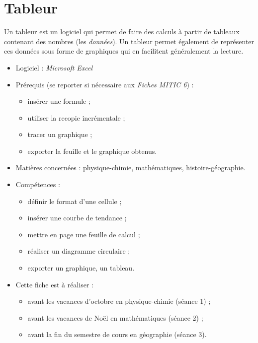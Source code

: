 \chapter{Tableur}  

Un tableur est un logiciel qui permet de faire des calculs à partir de tableaux contenant des nombres (les \emph{données}). Un tableur permet également de représenter ces données sous forme de graphiques qui en facilitent généralement la lecture.

{\footnotesize
\begin{itemize}
\item Logiciel : \emph{Microsoft Excel}
\item Prérequis (se reporter si nécessaire aux \emph{Fiches MITIC 6}) :
        \begin{itemize}
        \item insérer une formule ;
        \item utiliser la recopie incrémentale ;
        \item tracer un graphique ;
        \item exporter la feuille et le graphique obtenus.
        \end{itemize}
\item Matières concernées : physique-chimie, mathématiques, histoire-géographie.
\item Compétences : 
        \begin{itemize}
        \item définir le format d'une cellule ;
        \item insérer une courbe de tendance ;
        \item mettre en page une feuille de calcul ;
        \item réaliser un diagramme circulaire ;
        \item exporter un graphique, un tableau.
        \end{itemize}
\item Cette fiche est à réaliser :
        \begin{itemize}
        \item avant les vacances d'octobre en physique-chimie (séance 1) ;
        \item avant les vacances de Noël en mathématiques (séance 2) ;
        \item avant la fin du semestre de cours en géographie (séance 3). 
        \end{itemize}
\end{itemize}
}%

